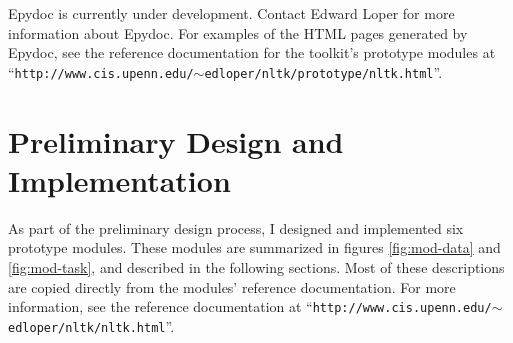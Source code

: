 \documentclass{article}
\begin{document}
Epydoc is currently under development.  Contact Edward Loper for more
information about Epydoc.  For examples of the HTML pages generated by
Epydoc, see the reference documentation for the toolkit's prototype
modules at 
``\texttt{http://www.cis.upenn.edu/$\sim$edloper/nltk/prototype/nltk.html}''.

\section{Preliminary Design and Implementation}

As part of the preliminary design process, I designed and implemented
six prototype modules.  These modules are summarized in figures
\ref{fig:mod-data} and \ref{fig:mod-task}, and described in the
following sections.  Most of these descriptions are copied directly from
the modules' reference documentation.  For more information, see the
reference documentation 
at ``\texttt{http://www.cis.upenn.edu/$\sim$edloper/nltk/nltk.html}''.
\end{document}
